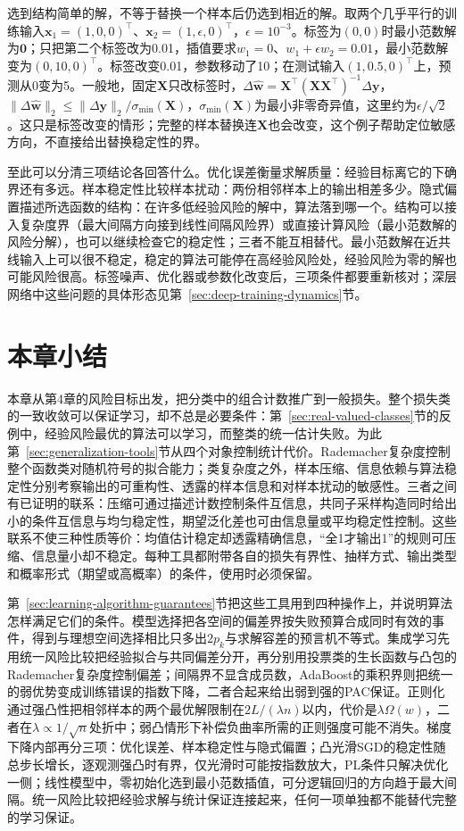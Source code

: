 选到结构简单的解，不等于替换一个样本后仍选到相近的解。取两个几乎平行的训练输入$\bm x_1=(1,0,0)^\top$、$\bm x_2=(1,\epsilon,0)^\top$，$\epsilon=10^{-3}$。标签为$(0,0)$时最小范数解为$\bm 0$；只把第二个标签改为0.01，插值要求$w_1=0$、$w_1+\epsilon w_2=0.01$，最小范数解变为$(0,10,0)^\top$。标签改变0.01，参数移动了10；在测试输入$(1,0.5,0)^\top$上，预测从0变为5。一般地，固定$\bm X$只改标签时，$\Delta\widehat{\bm w}=\bm X^\top(\bm X\bm X^\top)^{-1}\Delta\bm y$，$\|\Delta\widehat{\bm w}\|_2\leq\|\Delta\bm y\|_2/\sigma_{\min}(\bm X)$，$\sigma_{\min}(\bm X)$为最小非零奇异值，这里约为$\epsilon/\sqrt2$。这只是标签改变的情形；完整的样本替换连$\bm X$也会改变，这个例子帮助定位敏感方向，不直接给出替换稳定性的界。

至此可以分清三项结论各回答什么。优化误差衡量求解质量：经验目标离它的下确界还有多远。样本稳定性比较样本扰动：两份相邻样本上的输出相差多少。隐式偏置描述所选函数的结构：在许多低经验风险的解中，算法落到哪一个。结构可以接入复杂度界（最大间隔方向接到线性间隔风险界）或直接计算风险（最小范数解的风险分解），也可以继续检查它的稳定性；三者不能互相替代。最小范数解在近共线输入上可以很不稳定，稳定的算法可能停在高经验风险处，经验风险为零的解也可能风险很高。标签噪声、优化器或参数化改变后，三项条件都要重新核对；深层网络中这些问题的具体形态见第~\ref{sec:deep-training-dynamics}节。

\section{本章小结}
\label{sec:general-learning-summary}

本章从第4章的风险目标出发，把分类中的组合计数推广到一般损失。整个损失类的一致收敛可以保证学习，却不总是必要条件：第~\ref{sec:real-valued-classes}节的反例中，经验风险最优的算法可以学习，而整类的统一估计失败。为此第~\ref{sec:generalization-tools}节从四个对象控制统计代价。Rademacher复杂度控制整个函数类对随机符号的拟合能力；类复杂度之外，样本压缩、信息依赖与算法稳定性分别考察输出的可重构性、透露的样本信息和对样本扰动的敏感性。三者之间有已证明的联系：压缩可通过描述计数控制条件互信息，共同子采样构造同时给出小的条件互信息与均匀稳定性，期望泛化差也可由信息量或平均稳定性控制。这些联系不使三种性质等价：均值估计稳定却透露精确信息，“全1才输出1”的规则可压缩、信息量小却不稳定。每种工具都附带各自的损失有界性、抽样方式、输出类型和概率形式（期望或高概率）的条件，使用时必须保留。

第~\ref{sec:learning-algorithm-guarantees}节把这些工具用到四种操作上，并说明算法怎样满足它们的条件。模型选择把各空间的偏差界按失败预算合成同时有效的事件，得到与理想空间选择相比只多出$2p_k$与求解容差的预言机不等式。集成学习先用统一风险比较把经验拟合与共同偏差分开，再分别用投票类的生长函数与凸包的Rademacher复杂度控制偏差；间隔界不显含成员数，AdaBoost的乘积界则把统一的弱优势变成训练错误的指数下降，二者合起来给出弱到强的PAC保证。正则化通过强凸性把相邻样本的两个最优解限制在$2L/(\lambda n)$以内，代价是$\lambda\Omega(w)$，二者在$\lambda\propto1/\sqrt n$处折中；弱凸情形下补偿负曲率所需的正则强度可能不消失。梯度下降内部再分三项：优化误差、样本稳定性与隐式偏置；凸光滑SGD的稳定性随总步长增长，逐观测强凸时有界，仅光滑时可能按指数放大，PL条件只解决优化一侧；线性模型中，零初始化选到最小范数插值，可分逻辑回归的方向趋于最大间隔。统一风险比较把经验求解与统计保证连接起来，任何一项单独都不能替代完整的学习保证。


